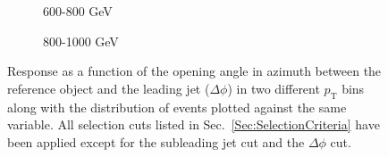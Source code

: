 \begin{figure}[!ht]
  \centering
  \begin{subfigure}{.5\textwidth}
    \centering
    \caption{600-800 GeV}
  \end{subfigure}%
  \begin{subfigure}{.5\textwidth}
    \centering
    \caption{800-1000 GeV}
  \end{subfigure}
  \caption[Response as a function of the $\Delta\phi$ cut, 600-800 and 800-1000 GeV bins]
  {\small Response as a function of the opening angle in azimuth between the reference object and the leading jet ($\Delta\phi$) in two different $p_{\mathrm T}$ bins along with the distribution of events plotted against the same variable.  All selection cuts listed in Sec.~\ref{Sec:SelectionCriteria} have been applied except for the subleading jet cut and the $\Delta\phi$ cut.  }
  \label{plot:GJetEMdPhi600-800_2016App}
\end{figure}

